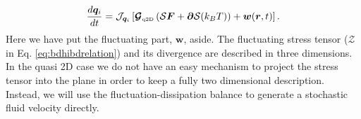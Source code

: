\documentclass[ twoside,openright,titlepage,numbers=noenddot,%
headinclude,footinclude,cleardoublepage=empty,abstract=on,
BCOR=5mm,paper=b5,fontsize=11pt, dvipsnames
]{scrreprt}
\renewcommand{\vec}[1]{\bm{#1}}
\newcommand{\tens}[1]{\bm{\mathcal{#1}}}
\newcommand{\oper}[1]{\mathcal{#1}}
\newcommand{\kT}{k_B T}
\newcommand{\fou}[1]{\widehat{#1}}
\newcommand{\ppos}{q}
\newcommand{\fpos}{r}
\newcommand{\qtd}{\text{\tiny q2D}}
\begin{document}
\begin{equation}
  \label{eq:q2dbdhirel}
  \frac{d\vec{\ppos}_i}{dt} = \oper{J}_{\vec{\ppos}_i}\left[\tens{G}_{\qtd}\left(\oper{S}\vec{F} + \vec{\partial}\oper{S}(\kT)\right) + \vec{w}(\vec{\fpos}, t)\right].
\end{equation}
Here we have put the fluctuating part, $\vec{w}$, aside. The fluctuating stress tensor ($\tens{Z}$ in Eq. \eqref{eq:bdhibdrelation}) and its divergence are described in three dimensions. In the quasi 2D case we do not have an easy mechanism to project the stress tensor into the plane in order to keep a fully two dimensional description. Instead, we will use the fluctuation-dissipation balance to generate a stochastic fluid velocity directly.
%
\end{document}
